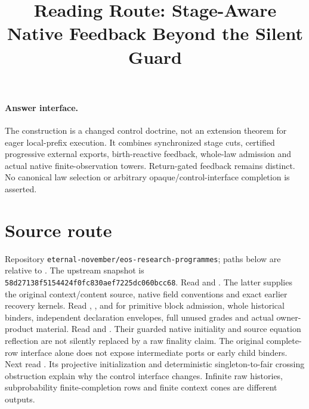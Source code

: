 \documentclass{article}
\title{Reading Route: Stage-Aware Native Feedback Beyond the Silent Guard}
\begin{document}
\maketitle
\paragraph{Answer interface.} The construction is a changed control doctrine, not an extension theorem for eager local-prefix execution. It combines synchronized stage cuts, certified progressive external exports, birth-reactive feedback, whole-law admission and actual native finite-observation towers. Return-gated feedback remains distinct. No canonical law selection or arbitrary opaque/control-interface completion is asserted.
\section{Source route}
Repository \texttt{eternal-november/eos-research-programmes}; paths below are relative to . The upstream snapshot is \texttt{58d27138f5154424f0fc830aef7225dc060bcc68}.
Read  and . The latter supplies the original context/content source, native field conventions and exact earlier recovery kernels. Read , , and  for primitive block admission, whole historical binders, independent declaration envelopes, full unused grades and actual owner-product material.
Read  and . Their guarded native initiality and source equation reflection are not silently replaced by a raw finality claim. The original complete-row interface alone does not expose intermediate ports or early child binders.
Next read . Its projective initialization and deterministic singleton-to-fair crossing obstruction explain why the control interface changes. Infinite raw histories, subprobability finite-completion rows and finite context cones are different outputs.
\end{document}
